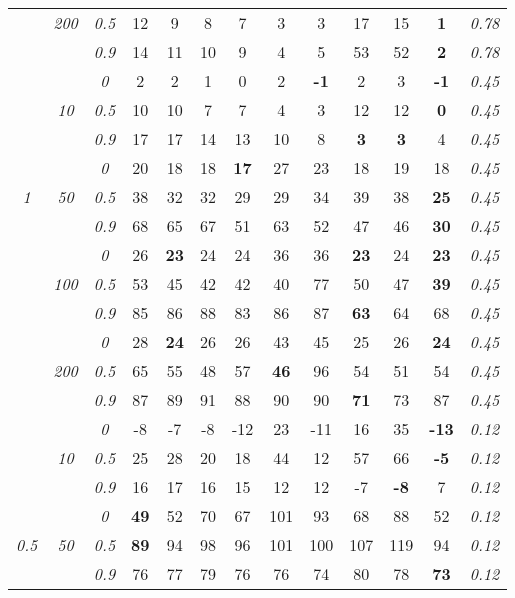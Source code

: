 \begin{table}
\begin{center}
\begin{tabular}{ccc|cc|cc|cc|cc|c|c}
 & \it  200  & \it  0.5  & 12 & 9 & 8 & 7 & 3 & 3 & 17 & 15 & {\bf 1} & \it  0.78 \\
& & \it  0.9  & 14 & 11 & 10 & 9 & 4 & 5 & 53 & 52 & {\bf 2} & \it  0.78 \\
\hline\rule{0pt}{3ex}
& & \it  0  & 2 & 2 & 1 & 0 & 2 & {\bf -1} & 2 & 3 & {\bf -1} & \it  0.45 \\
 & \it  10  & \it  0.5  & 10 & 10 & 7 & 7 & 4 & 3 & 12 & 12 & {\bf 0} & \it  0.45 \\
& & \it  0.9  & 17 & 17 & 14 & 13 & 10 & 8 & {\bf 3} & {\bf 3} & 4 & \it  0.45 \\[1ex]
\cline{2-3}\rule{0pt}{3ex}
& & \it  0  & 20 & 18 & 18 & {\bf 17} & 27 & 23 & 18 & 19 & 18 & \it  0.45 \\
\it  1  & \it  50  & \it  0.5  & 38 & 32 & 32 & 29 & 29 & 34 & 39 & 38 & {\bf 25} & \it  0.45 \\
& & \it  0.9  & 68 & 65 & 67 & 51 & 63 & 52 & 47 & 46 & {\bf 30} & \it  0.45 \\[1ex]
\cline{2-3}\rule{0pt}{3ex}
& & \it  0  & 26 & {\bf 23} & 24 & 24 & 36 & 36 & {\bf 23} & 24 & {\bf 23} & \it  0.45 \\
 & \it  100  & \it  0.5  & 53 & 45 & 42 & 42 & 40 & 77 & 50 & 47 & {\bf 39} & \it  0.45 \\
& & \it  0.9  & 85 & 86 & 88 & 83 & 86 & 87 & {\bf 63} & 64 & 68 & \it  0.45 \\[1ex]
\cline{2-3}\rule{0pt}{3ex}
& & \it  0  & 28 & {\bf 24} & 26 & 26 & 43 & 45 & 25 & 26 & {\bf 24} & \it  0.45 \\
 & \it  200  & \it  0.5  & 65 & 55 & 48 & 57 & {\bf 46} & 96 & 54 & 51 & 54 & \it  0.45 \\
& & \it  0.9  & 87 & 89 & 91 & 88 & 90 & 90 & {\bf 71} & 73 & 87 & \it  0.45 \\
\hline\rule{0pt}{3ex}
& & \it  0  & -8 & -7 & -8 & -12 & 23 & -11 & 16 & 35 & {\bf -13} & \it  0.12 \\
 & \it  10  & \it  0.5  & 25 & 28 & 20 & 18 & 44 & 12 & 57 & 66 & {\bf -5} & \it  0.12 \\
& & \it  0.9  & 16 & 17 & 16 & 15 & 12 & 12 & -7 & {\bf -8} & 7 & \it  0.12 \\[1ex]
\cline{2-3}\rule{0pt}{3ex}
& & \it  0  & {\bf 49} & 52 & 70 & 67 & 101 & 93 & 68 & 88 & 52 & \it  0.12 \\
\it  0.5  & \it  50  & \it  0.5  & {\bf 89} & 94 & 98 & 96 & 101 & 100 & 107 & 119 & 94 & \it  0.12 \\
& & \it  0.9  & 76 & 77 & 79 & 76 & 76 & 74 & 80 & 78 & {\bf 73} & \it  0.12 \\[1ex]

\end{tabular}
\end{center}
\end{table}
